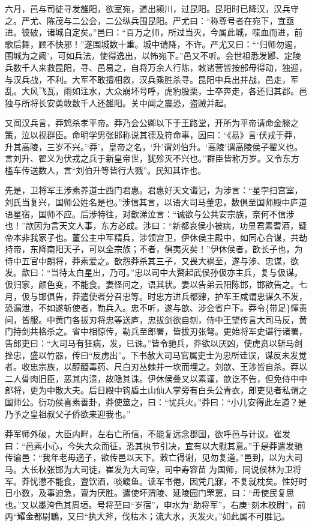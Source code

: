 \documentclass[]{article}
\begin{document}
六月，邑与司徒寻发雒阳，欲室宛，道出颍川，过昆阳。昆阳时已降汉，汉兵守之。严尤、陈茂与二公会，二公纵兵围昆阳。严尤曰：``称尊号者在宛下，宜亟进。彼破，诸城自定矣。''邑曰：``百万之师，所过当灭，今属此城，喋血而进，前歌后舞，顾不快邪！''遂围城数十重。城中请降，不许。严尤又曰：```归师勿遏，围城为之阙'，可如兵法，使得逸出，以怖宛下。''邑又不听。会世祖悉发郾、定陵兵数千人来救昆阳，寻、邑易之，自将万余人行陈，敕诸营皆按部毋得动，独迎，与汉兵战，不利。大军不敢擅相救，汉兵乘胜杀寻。昆阳中兵出并战，邑走，军乱。大风飞瓦，雨如注水，大众崩坏号呼，虎豹股栗，士卒奔走，各还归其郡。邑独与所将长安勇敢数千人还雒阳。关中闻之震恐，盗贼并起。

又闻汉兵言，莽鸩杀孝平帝。莽乃会公卿以下于王路堂，开所为平帝请命金滕之策，泣以视群臣。命明学男张邯称说其德及符命事，因曰：``《易》言`伏戎于莽，升其高陵，三岁不兴。'`莽'，皇帝之名，`升'谓刘伯升。`高陵'谓高陵侯子翟义也。言刘升、翟义为伏戎之兵于新皇帝世，犹殄灭不兴也。''群臣皆称万岁。又令东方槛车传送数人，言``刘伯升等皆行大戮''。民知其诈也。

先是，卫将军王涉素养道士西门君惠。君惠好天文谶记，为涉言：``星孛扫宫室，刘氏当复兴，国师公姓名是也。''涉信其言，以语大司马董忠，数俱至国师殿中庐道语星宿，国师不应。后涉特往，对歆涕泣言：``诚欲与公共安宗族，奈何不信涉也！''歆因为言天文人事，东方必成。涉曰：``新都哀侯小被病，功显君素耆酒，疑帝本非我家子也。董公主中军精兵，涉领宫卫，伊休侯主殿中，如同心合谋，共劫持帝，东降南阳天子，可以全宗族；不者，俱夷灭矣！''伊休侯者，歆长子也，为侍中五官中朗将，莽素爱之。歆怨莽杀其三子，又畏大祸至，遂与涉、忠谋，欲发。歆曰：``当待太白星出，乃可。''忠以司中大赘起武侯孙伋亦主兵，复与伋谋。伋归家，颜色变，不能食。妻怪问之，语其状。妻以告弟云阳陈邯，邯欲告之。七月，伋与邯俱告，莽遣使者分召忠等。时忠方进兵都肄，护军王咸谓忠谋久不发，恐漏泄，不如遂斩使者，勒兵入。忠不听，遂与歆、涉会省户下。莽令\{带足\}惲责问，皆服。中黄门各拔刃将忠等送庐，忠拔剑欲自刎，侍中王望传言大司马反，黄门持剑共格杀之。省中相惊传，勒兵至郎署，皆拔刃张弩。更始将军史谌行诸署，告郎吏曰：``大司马有狂病，发，已诛。''皆令驰兵，莽欲以厌凶，使虎贲以斩马剑挫忠，盛以竹器，传曰``反虏出''。下书赦大司马官属吏士为忠所诖误，谋反未发觉者。收忠宗族，以醇醯毒药、尺白刃丛棘并一坎而埋之。刘歆、王涉皆自杀。莽以二人骨肉旧臣，恶其内溃，故隐其诛。伊休侯叠又以素谨，歆讫不告，但免侍中中郎将，更为中散大夫。后日殿中钩盾土山仙人掌旁有白头公青衣，郎吏见者私谓之国师公。衍功侯喜素善卦，莽使筮之，曰：``忧兵火。''莽曰：``小儿安得此左道？是乃予之皇祖叔父子侨欲来迎我也。''

莽军师外破，大臣内畔，左右亡所信，不能复远念郡国，欲呼邑与计议。崔发曰：``邑素小心，今失大众而征，恐其执节引决，宜有以大慰其意。''于是莽遣发驰传谕邑：``我年老毋適子，欲传邑以天下。敕亡得谢，见勿复道。''邑到，以为大司马。大长秋张邯为大司徒，崔发为大司空，司中寿容苗为国师，同说侯林为卫将军。莽忧懑不能食，亶饮酒，啖鳆鱼。读军书倦，因凭几寐，不复就枕矣。性好时日小数，及事迫急，亶为厌胜。遣使坏渭陵、延陵园门罘罳，曰：``毋使民复思也。''又以墨洿色其周垣。号将至曰``岁宿''，申水为``助将军''，右庚``刻木校尉''，前丙``耀金都尉鸀，又曰``执大斧，伐枯木；流大水，灭发火。''如此属不可胜记。
\end{document}
